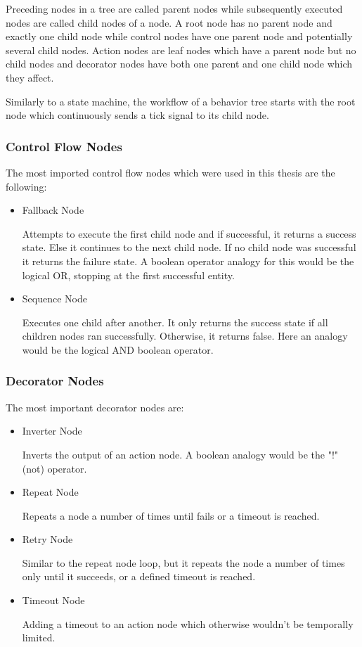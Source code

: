     Preceding nodes in a tree are called parent nodes while subsequently executed nodes are called child nodes of a node. A root node has no parent node and exactly one child node while control nodes have one parent node and potentially several child nodes. Action nodes are leaf nodes which have a parent node but no child nodes and decorator nodes have both one parent and one child node which they affect.

    Similarly to a state machine, the workflow of a behavior tree starts with the root node which continuously sends a tick signal to its child node. 

\subsubsection{Control Flow Nodes}

The most imported control flow nodes which were used in this thesis are the following:

\begin{itemize}
    \item Fallback Node
    
    Attempts to execute the first child node and if successful, it returns a success state. Else it continues to the next child node. If no child node was successful it returns the failure state. A boolean operator analogy for this would be the logical OR, stopping at the first successful entity.
    \item Sequence Node
    
    Executes one child after another. It only returns the success state if all children nodes ran successfully. Otherwise, it returns false. Here an analogy would be the logical AND boolean operator.
\end{itemize}

\subsubsection{Decorator Nodes}\label{subsubsec:decorator_nodes}

The most important decorator nodes are:

\begin{itemize}
    \item Inverter Node
    
    Inverts the output of an action node. A boolean analogy would be the "!" (not) operator.
    \item Repeat Node
    
    Repeats a node a number of times until fails or a timeout is reached. 
    \item Retry Node
    
    Similar to the repeat node loop, but it repeats the node a number of times only until it succeeds, or a defined timeout is reached.
    \item Timeout Node
    
    Adding a timeout to an action node which otherwise wouldn't be temporally limited.
\end{itemize}

